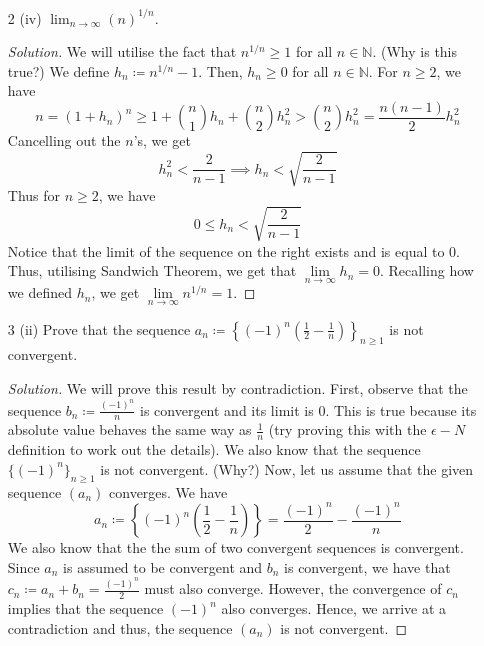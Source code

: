 \documentclass[12pt]{article}
\def\ddfrac#1#2{\displaystyle\frac{\displaystyle #1}{\displaystyle #2}}
\theoremstyle{definition}
\newenvironment{soln}{\begin{proof}[Solution]}{\end{proof}}
\begin{document}
\begin{enumerate}[leftmargin=*]
    \itemsep0.5em
    \item[2 (iv)] $\displaystyle\lim_{n\to \infty}(n)^{1/n}.$
    \begin{soln}
        We will utilise the fact that $n^{1/n} \geq 1$ for all $n \in \mathbb{N}$. (Why is this true?) We define $h_n \coloneqq n^{1/n} - 1$. Then, $h_n \geq 0$ for all $n \in \mathbb{N}$. For $n\geq2$, we have
        \[
            n = (1+h_n)^n \geq 1 + \binom{n}{1} h_n + \binom{n}{2} h_n^2 > \binom{n}{2} h_n^2 = \frac{n(n-1)}{2} h_n^2
        \]
        Cancelling out the $n$'s, we get
        \[
            h_n^2 < \frac{2}{n-1} \implies h_n < \sqrt{\frac{2}{n-1}}
        \]  
        Thus for $n \geq 2$, we have
        \[
            0 \leq h_n < \sqrt{\frac{2}{n-1}}
        \]
        Notice that the limit of the sequence on the right exists and is equal to $0$. Thus, utilising Sandwich Theorem, we get that $\lim\limits_{n \to \infty} h_n = 0$. Recalling how we defined $h_n$, we get $\lim\limits_{n \to \infty} n^{1/n} = 1$.
    \end{soln}
    
    \newpage
    
    \item[3 (ii)] Prove that the sequence $a_n \coloneqq \left\{ (-1)^n \left( \ddfrac{1}{2} - \ddfrac{1}{n} \right) \right\}_{n \geq 1}$ is not convergent.
    
    \begin{soln}
        We will prove this result by contradiction. First, observe that the sequence $b_n \coloneqq \ddfrac{(-1)^n}{n}$ is convergent and its limit is $0$. This is true because its absolute value behaves the same way as $\ddfrac{1}{n}$ (try proving this with the $\epsilon-N$ definition to work out the details). We also know that the sequence $\{(-1)^n\}_{n \geq 1}$ is not convergent. (Why?) Now, let us assume that the given sequence $(a_n)$ converges. We have
        \[
            a_n \coloneqq \left\{ (-1)^n \left( \ddfrac{1}{2} - \ddfrac{1}{n} \right) \right\} = \frac{(-1)^n}{2} - \frac{(-1)^n}{n}
        \]
        We also know that the the sum of two convergent sequences is convergent. Since $a_n$ is assumed to be convergent and $b_n$ is convergent, we have that $c_n \coloneqq a_n + b_n = \ddfrac{(-1)^n}{2}$ must also converge. However, the convergence of $c_n$ implies that the sequence $(-1)^n$ also converges. Hence, we arrive at a contradiction and thus, the sequence $(a_n)$ is not convergent.
        

\end{soln}
\end{enumerate}
\end{document}
